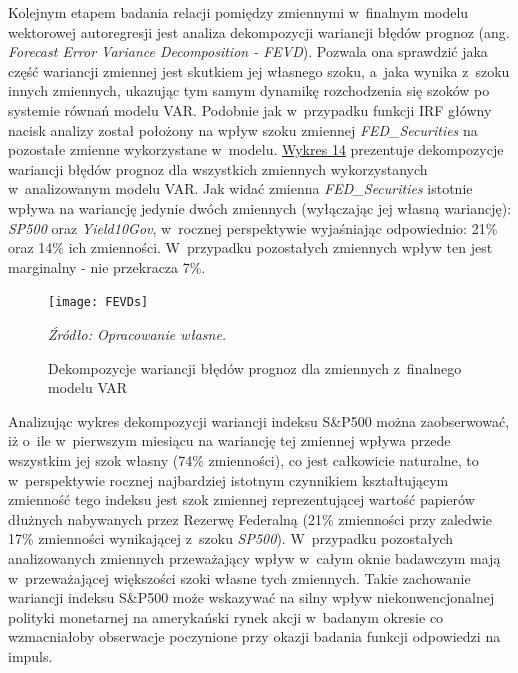 Kolejnym etapem badania relacji pomiędzy zmiennymi w~finalnym modelu wektorowej autoregresji jest analiza dekompozycji wariancji błędów prognoz (ang. \textit{Forecast Error Variance Decomposition - FEVD}). Pozwala ona sprawdzić jaka część wariancji zmiennej jest skutkiem jej własnego szoku, a~jaka wynika z~szoku innych zmiennych, ukazując tym samym dynamikę rozchodzenia się szoków po systemie równań modelu \acs{VAR}. Podobnie jak w~przypadku funkcji \acs{IRF} główny nacisk analizy został położony na wpływ szoku zmiennej \textit{FED_Securities} na pozostałe zmienne wykorzystane w~modelu. \hyperlink{fig15}{Wykres 14} prezentuje dekompozycje wariancji błędów prognoz dla wszystkich zmiennych wykorzystanych w~analizowanym modelu  \acs{VAR}. Jak widać zmienna \textit{FED_Securities} istotnie wpływa na wariancję jedynie dwóch zmiennych (wyłączając jej własną wariancję): \textit{SP500} oraz \textit{Yield10Gov}, w~rocznej perspektywie wyjaśniając odpowiednio: 21\% oraz 14\% ich zmienności. W~przypadku pozostałych zmiennych wpływ ten jest marginalny - nie przekracza 7\%. 

\vspace{0.25cm}
\hypertarget{fig15}{}
\begin{figure}[h]
\begin{centering}
  \hspace{-0.55cm}\texttt{[image: FEVDs]}
    \captionsetup{format=hang}
    \caption{Dekompozycje wariancji błędów prognoz dla zmiennych z~finalnego modelu VAR}
\end{centering}
\begin{flushleft}
\hspace{1cm}\textit{\footnotesize{Źródło: Opracowanie własne.}} \\
\end{flushleft}
\vspace{-0.5cm}
\end{figure} 

Analizując wykres dekompozycji wariancji indeksu S\&P500 można zaobserwować, iż o~ile w~pierwszym miesiącu na wariancję tej zmiennej wpływa przede wszystkim jej szok własny (74\% zmienności), co jest całkowicie naturalne, to w~perspektywie rocznej najbardziej istotnym czynnikiem kształtującym zmienność tego indeksu jest szok zmiennej reprezentującej wartość papierów dłużnych nabywanych przez Rezerwę Federalną (21\% zmienności przy zaledwie 17\% zmienności wynikającej z~szoku \textit{SP500}). W~przypadku pozostałych analizowanych zmiennych przeważający wpływ w~całym oknie badawczym mają w~przeważającej większości szoki własne tych zmiennych. Takie zachowanie wariancji indeksu S\&P500 może wskazywać na silny wpływ niekonwencjonalnej polityki monetarnej na amerykański rynek akcji w~badanym okresie co wzmacniałoby obserwacje poczynione przy okazji badania funkcji odpowiedzi na impuls. 


